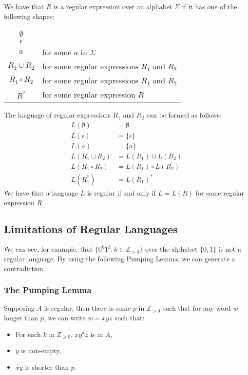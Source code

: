 We have that $R$ is a regular expression over an alphabet
$\Sigma$ if it has one of the following shapes:
\begin{center}
    \begin{tabular}{ c l }
        $\emptyset$ & \\
        $\epsilon$ & \\
        $a$ & for some $a$ in $\Sigma$ \\
        $R_1 \cup R_2$ & for some regular expressions $R_1$ and $R_2$ \\
        $R_1 \circ R_2$ & for some regular expressions $R_1$ and $R_2$ \\
        $R^*$ & for some regular expression $R$ \\
    \end{tabular}
\end{center} The language of regular expressions $R_1$ and $R_2$
can be formed as follows: \begin{align*}
    L(\emptyset) &= \emptyset \\
    L(\epsilon) &= \{\epsilon\} \\
    L(a) &= \{a\} \\
    L(R_1 \cup R_2) &= L(R_1) \cup L(R_2) \\
    L(R_1 \circ R_2) &= L(R_1) \circ L(R_2) \\
    L(R_1^*) &= L(R_1)^*
\end{align*} We have that a language $L$ is regular
if and only if $L = L(R)$ for some regular expression $R$.

\subsection{Limitations of Regular Languages}

We can see, for example, that $\{0^k1^k : k \in \mathbb{Z}_{>0}\}$
over the alphabet $\{0, 1\}$ is not a regular language. By
using the following Pumping Lemma, we can generate a contradiction.

\subsubsection{The Pumping Lemma}

Supposing $A$ is regular, then there is some $p$ in $\mathbb{Z}_{>0}$
such that for any word $w$ longer than $p$, we can write $w = xyz$ 
such that: \begin{itemize}
    \item For each $k$ in $\mathbb{Z}_{\geq 0}$, $xy^kz$ is in $A$,
    \item $y$ is non-empty,
    \item $xy$ is shorter than $p$.   
\end{itemize}
